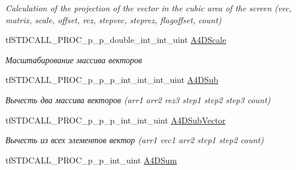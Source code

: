 \begin{DoxyCompactItemize}
\begin{DoxyCompactList}\small\item\em Calculation of the projection of the vector in the cubic area of the screen (vec, matrix, scale, offset, rez, stepvec, steprez, flagoffset, count) \end{DoxyCompactList}\item 
\hypertarget{structs_functions_array_vector_c_p_u_a1f9529d10bceb6906dc4144ac362a2f2}{tf\-S\-T\-D\-C\-A\-L\-L\-\_\-\-P\-R\-O\-C\-\_\-p\-\_\-p\-\_\-double\-\_\-int\-\_\-int\-\_\-uint \hyperlink{structs_functions_array_vector_c_p_u_a1f9529d10bceb6906dc4144ac362a2f2}{A4\-D\-Scale}}\label{structs_functions_array_vector_c_p_u_a1f9529d10bceb6906dc4144ac362a2f2}

\begin{DoxyCompactList}\small\item\em Масштабирование массива векторов \end{DoxyCompactList}\item 
\hypertarget{structs_functions_array_vector_c_p_u_ac3f2039c7a582305f70cd4a42402b4cc}{tf\-S\-T\-D\-C\-A\-L\-L\-\_\-\-P\-R\-O\-C\-\_\-p\-\_\-p\-\_\-p\-\_\-int\-\_\-int\-\_\-int\-\_\-uint \hyperlink{structs_functions_array_vector_c_p_u_ac3f2039c7a582305f70cd4a42402b4cc}{A4\-D\-Sub}}\label{structs_functions_array_vector_c_p_u_ac3f2039c7a582305f70cd4a42402b4cc}

\begin{DoxyCompactList}\small\item\em Вычесть два массива векторов (arr1 arr2 rez3 step1 step2 step3 count) \end{DoxyCompactList}\item 
\hypertarget{structs_functions_array_vector_c_p_u_ae53f4fa71422858b9233b35fce49f40a}{tf\-S\-T\-D\-C\-A\-L\-L\-\_\-\-P\-R\-O\-C\-\_\-p\-\_\-p\-\_\-p\-\_\-int\-\_\-int\-\_\-uint \hyperlink{structs_functions_array_vector_c_p_u_ae53f4fa71422858b9233b35fce49f40a}{A4\-D\-Sub\-Vector}}\label{structs_functions_array_vector_c_p_u_ae53f4fa71422858b9233b35fce49f40a}

\begin{DoxyCompactList}\small\item\em Вычесть из всех элементов вектор (arr1 vec1 arr2 step1 step2 count) \end{DoxyCompactList}\item 
\hypertarget{structs_functions_array_vector_c_p_u_ae0b10b8e244b7c4f0214e17df6a0c149}{tf\-S\-T\-D\-C\-A\-L\-L\-\_\-\-P\-R\-O\-C\-\_\-p\-\_\-p\-\_\-int\-\_\-uint \hyperlink{structs_functions_array_vector_c_p_u_ae0b10b8e244b7c4f0214e17df6a0c149}{A4\-D\-Sum}}\label{structs_functions_array_vector_c_p_u_ae0b10b8e244b7c4f0214e17df6a0c149}


\end{DoxyCompactItemize}
